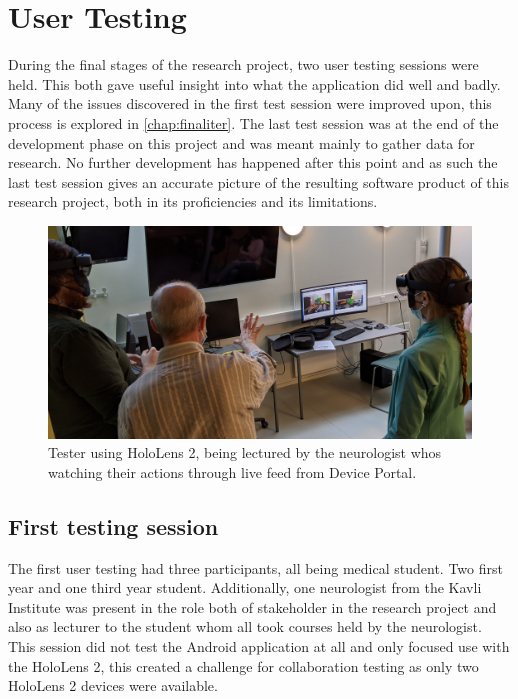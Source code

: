 \section{User Testing}
During the final stages of the research project, two user testing sessions were held. This both gave useful insight into what the application did well and badly. Many of the issues discovered in the first test session were improved upon, this process is explored in \autoref{chap:finaliter}. The last test session was at the end of the development phase on this project and was meant mainly to gather data for research. No further development has happened after this point and as such the last test session gives an accurate picture of the resulting software product of this research project, both in its proficiencies and its limitations. 

\begin{figure}[ht]
    \includegraphics[width={\textwidth}]{fig/usertesthololivestream.jpg}
    \caption{Tester using HoloLens 2, being lectured by the neurologist whos watching their actions through live feed from Device Portal.}
    \label{fig:usertesthololivestream}
\end{figure}

\subsection{First testing session}

The first user testing had three participants, all being medical student. Two first year and one third year student. Additionally, one neurologist from the Kavli Institute was present in the role both of stakeholder in the research project and also as lecturer to the student whom all took courses held by the neurologist. This session did not test the Android application at all and only focused use with the HoloLens 2, this created a challenge for collaboration testing as only two HoloLens 2 devices were available. 

